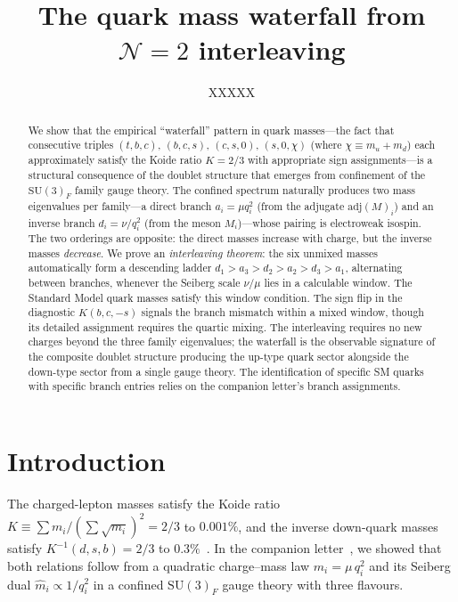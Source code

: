 \documentclass[preprint,12pt]{elsarticle}
\newcommand{\SU}{\mathrm{SU}}
\newcommand{\adj}{\mathrm{adj}}
\begin{document}
\begin{frontmatter}

\title{The quark mass waterfall from $\mathcal{N}{=}2$ interleaving}

\author{XXXXX}
\address{XXXXX}

\begin{abstract}
  We show that the empirical ``waterfall'' pattern in quark masses---the
  fact that consecutive triples $(t,b,c)$, $(b,c,s)$, $(c,s,0)$,
  $(s,0,\chi)$ (where $\chi \equiv m_u + m_d$) each approximately satisfy the Koide ratio $K = 2/3$
  with appropriate sign assignments---is a structural
  consequence of the doublet structure that emerges from
  confinement of the $\SU(3)_F$ family gauge theory.
  The confined spectrum naturally produces two mass eigenvalues
  per family---a direct branch $a_i = \mu q_i^2$ (from the
  adjugate $\adj(M)_i$) and an
  inverse branch $d_i = \nu/q_i^2$ (from the meson $M_i$)---whose
  pairing is electroweak isospin.
  The two orderings are opposite: the direct masses
  increase with charge, but the inverse masses \emph{decrease}.
  We prove an \emph{interleaving theorem}: the six unmixed masses
  automatically form a descending ladder
  $d_1 > a_3 > d_2 > a_2 > d_3 > a_1$, alternating between branches,
  whenever the Seiberg scale $\nu/\mu$ lies in a calculable window.
  The Standard Model quark masses satisfy this window condition.
  The sign flip in the diagnostic $K(b,c,-s)$ signals
  the branch mismatch within a mixed window, though its
  detailed assignment requires the quartic mixing.
  The interleaving requires no new charges beyond the three family
  eigenvalues; the waterfall is the observable signature of
  the composite doublet structure producing the up-type quark sector
  alongside the down-type sector from a single gauge theory.
  The identification of specific SM quarks with specific branch
  entries relies on the companion letter's branch assignments.
\end{abstract}

\end{frontmatter}

\section{Introduction}

The charged-lepton masses satisfy the Koide ratio
$K \equiv \sum m_i / (\sum\sqrt{m_i})^2 = 2/3$ to $0.001\%$,
and the inverse down-quark masses satisfy
$K^{-1}(d,s,b) = 2/3$ to $0.3\%$~\cite{Koide:1983qe,Rivero:2005}.
In the companion letter~\cite{letter_q2}, we showed that both
relations follow from a quadratic charge--mass law
$m_i = \mu\,q_i^2$ and its Seiberg dual $\hat{m}_i \propto 1/q_i^2$
in a confined $\SU(3)_F$ gauge theory with three flavours.
\end{document}
